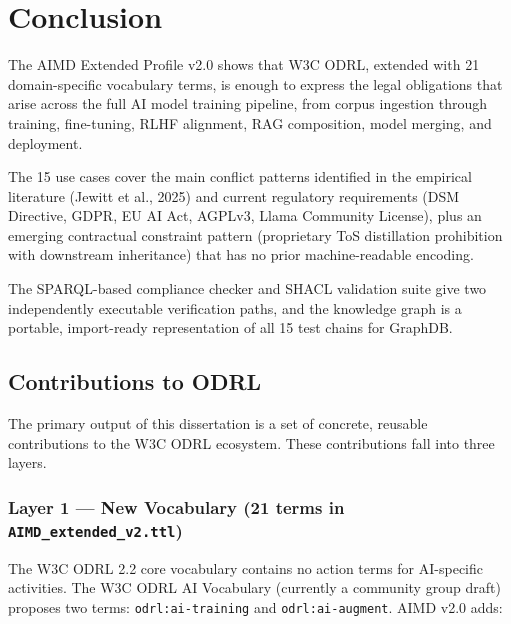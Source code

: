 \documentclass[12pt,a4paper]{article}
\begin{document}
\section{Conclusion}

The AIMD Extended Profile v2.0 shows that W3C ODRL, extended with 21 domain-specific vocabulary terms, is enough to express the legal obligations that arise across the full AI model training pipeline, from corpus ingestion through training, fine-tuning, RLHF alignment, RAG composition, model merging, and deployment.

The 15 use cases cover the main conflict patterns identified in the empirical literature (Jewitt et al., 2025) and current regulatory requirements (DSM Directive, GDPR, EU AI Act, AGPLv3, Llama Community License), plus an emerging contractual constraint pattern (proprietary ToS distillation prohibition with downstream inheritance) that has no prior machine-readable encoding.

The SPARQL-based compliance checker and SHACL validation suite give two independently executable verification paths, and the knowledge graph is a portable, import-ready representation of all 15 test chains for GraphDB.

\subsection{Contributions to ODRL}

The primary output of this dissertation is a set of concrete, reusable contributions to the W3C ODRL ecosystem. These contributions fall into three layers.

\subsubsection*{Layer 1 — New Vocabulary (21 terms in \texttt{AIMD\_extended\_v2.ttl})}

The W3C ODRL 2.2 core vocabulary contains no action terms for AI-specific activities. The W3C ODRL AI Vocabulary (currently a community group draft) proposes two terms: \texttt{odrl:ai-training} and \texttt{odrl:ai-augment}. AIMD v2.0 adds:
\end{document}
